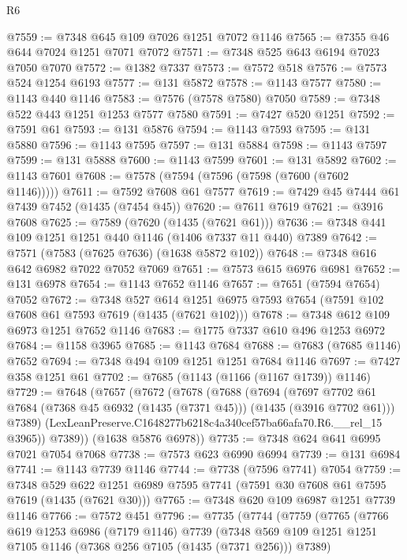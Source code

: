 \begin{lexlean}{R6}
\begin{coremodule}
@7559 := @7348 @645 @109 @7026 @1251 @7072 @1146
@7565 := @7355 @46 @644 @7024 @1251 @7071 @7072
@7571 := @7348 @525 @643 @6194 @7023 @7050 @7070
@7572 := @1382 @7337
@7573 := @7572 @518
@7576 := @7573 @524 @1254 @6193
@7577 := @131 @5872
@7578 := @1143 @7577
@7580 := @1143 @440 @1146
@7583 := @7576 (@7578 @7580) @7050
@7589 := @7348 @522 @443 @1251 @1253 @7577 @7580
@7591 := @7427 @520 @1251
@7592 := @7591 @61
@7593 := @131 @5876
@7594 := @1143 @7593
@7595 := @131 @5880
@7596 := @1143 @7595
@7597 := @131 @5884
@7598 := @1143 @7597
@7599 := @131 @5888
@7600 := @1143 @7599
@7601 := @131 @5892
@7602 := @1143 @7601
@7608 := @7578 (@7594 (@7596 (@7598 (@7600 (@7602 @1146)))))
@7611 := @7592 @7608 @61 @7577
@7619 := @7429 @45 @7444 @61 @7439 @7452 (@1435 (@7454 @45))
@7620 := @7611 @7619
@7621 := @3916 @7608
@7625 := @7589 (@7620 (@1435 (@7621 @61)))
@7636 := @7348 @441 @109 @1251 @1251 @440 @1146 (@1406 @7337 @11 @440) @7389
@7642 := @7571 (@7583 (@7625 @7636) (@1638 @5872 @102))
@7648 := @7348 @616 @642 @6982 @7022 @7052 @7069
@7651 := @7573 @615 @6976 @6981
@7652 := @131 @6978
@7654 := @1143 @7652 @1146
@7657 := @7651 (@7594 @7654) @7052
@7672 := @7348
    @527
    @614
    @1251
    @6975
    @7593
    @7654
    (@7591 @102 @7608 @61 @7593 @7619 (@1435 (@7621 @102)))
@7678 := @7348 @612 @109 @6973 @1251 @7652 @1146
@7683 := @1775 @7337 @610 @496 @1253 @6972
@7684 := @1158 @3965
@7685 := @1143 @7684
@7688 := @7683 (@7685 @1146) @7652
@7694 := @7348 @494 @109 @1251 @1251 @7684 @1146
@7697 := @7427 @358 @1251 @61
@7702 := @7685 (@1143 (@1166 (@1167 @1739)) @1146)
@7729 := @7648
    (@7657
      (@7672
        (@7678
          (@7688
            (@7694
              (@7697
                @7702
                @61
                @7684
                (@7368 @45 @6932 (@1435 (@7371 @45)))
                (@1435 (@3916 @7702 @61)))
              @7389)
            (LexLeanPreserve.C1648277b6218c4a340cef57ba66afa70.R6.__rel_15 @3965))
          @7389))
      (@1638 @5876 @6978))
@7735 := @7348 @624 @641 @6995 @7021 @7054 @7068
@7738 := @7573 @623 @6990 @6994
@7739 := @131 @6984
@7741 := @1143 @7739 @1146
@7744 := @7738 (@7596 @7741) @7054
@7759 := @7348
    @529
    @622
    @1251
    @6989
    @7595
    @7741
    (@7591 @30 @7608 @61 @7595 @7619 (@1435 (@7621 @30)))
@7765 := @7348 @620 @109 @6987 @1251 @7739 @1146
@7766 := @7572 @451
@7796 := @7735
    (@7744
      (@7759
        (@7765
          (@7766
            @619
            @1253
            @6986
            (@7179 @1146)
            @7739
            (@7348 @569 @109 @1251 @1251 @7105 @1146 (@7368 @256 @7105 (@1435 (@7371 @256))) @7389)

\end{coremodule}
\end{lexlean}
